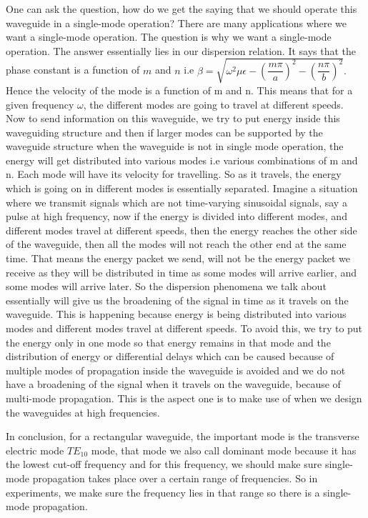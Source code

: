 One can ask the question, how do we get the saying that we should operate this waveguide in a single-mode operation? There are many applications where we want a single-mode operation. The question is why we want a single-mode operation. The answer essentially lies in our dispersion relation. It says that the phase constant is a function of $m$ and $n$ i.e $\beta = \sqrt{{\omega}^2\mu\epsilon - \left(\dfrac{m\pi}{a}\right)^2 - \left(\dfrac{n\pi}{b}\right)^2}.$ Hence the velocity of the mode is a function of m and n. This means that for a given frequency $\omega$, the different modes are going to travel at different speeds. Now to send information on this waveguide, we try to put energy inside this waveguiding structure and then if larger modes can be supported by the waveguide structure when the waveguide is not in single mode operation, the energy will get distributed into various modes i.e various combinations of m and n. Each mode will have its velocity for travelling. So as it travels, the energy which is going on in different modes is essentially separated. Imagine a situation where we transmit signals which are not time-varying sinusoidal signals, say a pulse at high frequency, now if the energy is divided into different modes, and different modes travel at different speeds, then the energy reaches the other side of the waveguide, then all the modes will not reach the other end at the same time. That means the energy packet we send, will not be the energy packet we receive as they will be distributed in time as some modes will arrive earlier, and some modes will arrive later. So the dispersion phenomena we talk about essentially will give us the broadening of the signal in time as it travels on the waveguide. This is happening because energy is being distributed into various modes and different modes travel at different speeds. To avoid this, we try to put the energy only in one mode so that energy remains in that mode and the distribution of energy or differential delays which can be caused because of multiple modes of propagation inside the waveguide is avoided and we do not have a broadening of the signal when it travels on the waveguide, because of multi-mode propagation. This is the aspect one is to make use of when we design the waveguides at high frequencies.

In conclusion, for a rectangular waveguide, the important mode is the transverse electric mode $TE_{10}$ mode, that mode we also call dominant mode because it has the lowest cut-off frequency and for this frequency, we should make sure single-mode propagation takes place over a certain range of frequencies. So in experiments, we make sure the frequency lies in that range so there is a single-mode propagation.

